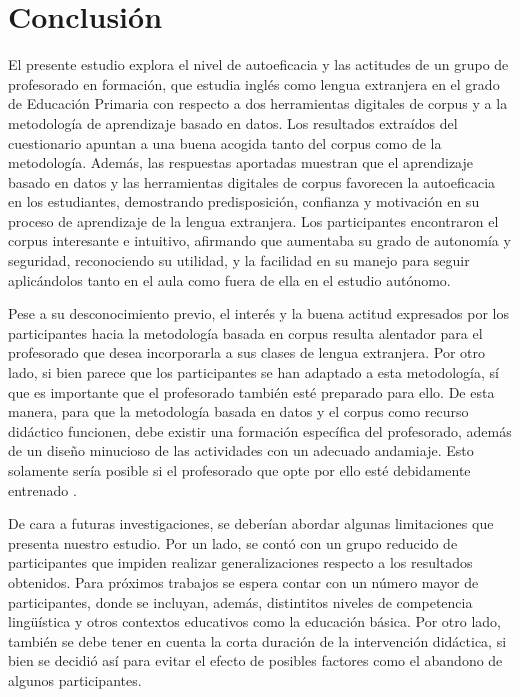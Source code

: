 \section{Conclusión}\label{sec-conclusión}

El presente estudio explora el nivel de autoeficacia y las actitudes de
un grupo de profesorado en formación, que estudia inglés como lengua
extranjera en el grado de Educación Primaria con respecto a dos
herramientas digitales de corpus y a la metodología de aprendizaje
basado en datos. Los resultados extraídos del cuestionario apuntan a una
buena acogida tanto del corpus como de la metodología. Además, las
respuestas aportadas muestran que el aprendizaje basado en datos y las
herramientas digitales de corpus favorecen la autoeficacia en los
estudiantes, demostrando predisposición, confianza y motivación en su
proceso de aprendizaje de la lengua extranjera. Los participantes
encontraron el corpus interesante e intuitivo, afirmando que aumentaba
su grado de autonomía y seguridad, reconociendo su utilidad, y la
facilidad en su manejo para seguir aplicándolos tanto en el aula como
fuera de ella en el estudio autónomo.

Pese a su desconocimiento previo, el interés y la buena actitud
expresados por los participantes hacia la metodología basada en corpus
resulta alentador para el profesorado que desea incorporarla a sus
clases de lengua extranjera. Por otro lado, si bien parece que los
participantes se han adaptado a esta metodología, sí que es importante
que el profesorado también esté preparado para ello. De esta manera,
para que la metodología basada en datos y el corpus como recurso
didáctico funcionen, debe existir una formación específica del
profesorado, además de un diseño minucioso de las actividades con un
adecuado andamiaje. Esto solamente sería posible si el profesorado que
opte por ello esté debidamente entrenado \cite{smart2014role}.

De cara a futuras investigaciones, se deberían abordar algunas
limitaciones que presenta nuestro estudio. Por un lado, se contó con un
grupo reducido de participantes que impiden realizar generalizaciones
respecto a los resultados obtenidos. Para próximos trabajos se espera
contar con un número mayor de participantes, donde se incluyan, además,
distintitos niveles de competencia lingüística y otros contextos
educativos como la educación básica. Por otro lado, también se debe
tener en cuenta la corta duración de la intervención didáctica, si bien
se decidió así para evitar el efecto de posibles factores como el
abandono de algunos participantes.
